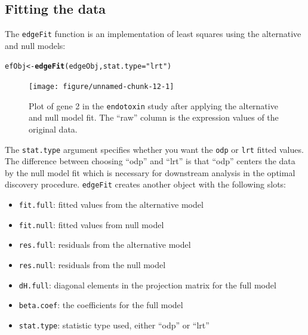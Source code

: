 \documentclass{article}\usepackage[]{graphicx}\usepackage[]{color}
\makeatletter
\newcommand{\hlstr}[1]{\textcolor[rgb]{0.192,0.494,0.8}{#1}}%
\newcommand{\hlstd}[1]{\textcolor[rgb]{0.345,0.345,0.345}{#1}}%
\newcommand{\hlkwb}[1]{\textcolor[rgb]{0.69,0.353,0.396}{#1}}%
\newcommand{\hlkwc}[1]{\textcolor[rgb]{0.333,0.667,0.333}{#1}}%
\newcommand{\hlkwd}[1]{\textcolor[rgb]{0.737,0.353,0.396}{\textbf{#1}}}%
\newenvironment{kframe}{%
 \def\at@end@of@kframe{}%
 \ifinner\ifhmode%
  \def\at@end@of@kframe{\end{minipage}}%
  \begin{minipage}{\columnwidth}%
 \fi\fi%
 \def\FrameCommand##1{\hskip\@totalleftmargin \hskip-\fboxsep
 \colorbox{shadecolor}{##1}\hskip-\fboxsep
     \hskip-\linewidth \hskip-\@totalleftmargin \hskip\columnwidth}%
 \MakeFramed {\advance\hsize-\width
   \@totalleftmargin\z@ \linewidth\hsize
   \@setminipage}}%
 {\par\unskip\endMakeFramed%
 \at@end@of@kframe}
\newenvironment{knitrout}{}{} %
\makeatother
\begin{document}
\subsection{Fitting the data}
The {\tt edgeFit} function is an implementation of least squares using the alternative and null models:
\begin{knitrout}
\color{fgcolor}\begin{kframe}
\begin{alltt}
\hlstd{efObj} \hlkwb{<-} \hlkwd{edgeFit}\hlstd{(edgeObj,} \hlkwc{stat.type} \hlstd{=} \hlstr{"lrt"}\hlstd{)}
\end{alltt}
\end{kframe}
\end{knitrout}

\begin{figure}[t]
 \centering
\begin{knitrout}
\color{fgcolor}

{\centering \texttt{[image: figure/unnamed-chunk-12-1]} 

}



\end{knitrout}
\caption{Plot of gene 2 in the {\tt endotoxin} study after applying the alternative and null model fit. The ``raw'' column is the expression values of the original data.}
\label{fig:eplotFit}
\end{figure}
The {\tt stat.type} argument specifies whether you want the {\tt odp} or {\tt lrt} fitted values. The difference between choosing ``odp'' and ``lrt'' is that ``odp'' centers the data by the null model fit which is necessary for downstream analysis in the optimal discovery procedure. {\tt edgeFit} creates another object with the following slots:
\begin{itemize}
\item {\tt fit.full}: fitted values from the alternative model
\item {\tt fit.null}: fitted values from null model
\item {\tt res.full}: residuals from the alternative model
\item {\tt res.null}: residuals from the null model
\item {\tt dH.full}: diagonal elements in the projection matrix for the full model
\item {\tt beta.coef}: the coefficients for the full model
\item {\tt stat.type}: statistic type used, either ``odp'' or ``lrt''
\end{itemize}
\end{document}
